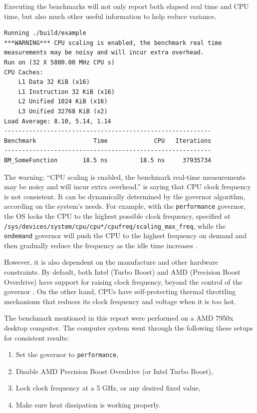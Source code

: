 \documentclass[logo,bsc,singlespacing,parskip]{infthesis}
\newenvironment{compactlist}
{ \begin{enumerate}
    \setlength{\itemsep}{0pt}
    \setlength{\parskip}{0pt}
    \setlength{\parsep}{0pt}     
}
{ \end{enumerate} }
\begin{document}
Executing the benchmarks will not only report both elapsed real time and CPU
time, but also much other useful information to help reduce variance. 
\begin{verbatim}
Running ./build/example
***WARNING*** CPU scaling is enabled, the benchmark real time 
measurements may be noisy and will incur extra overhead.
Run on (32 X 5800.00 MHz CPU s)
CPU Caches:
    L1 Data 32 KiB (x16)
    L1 Instruction 32 KiB (x16)
    L2 Unified 1024 KiB (x16)
    L3 Unified 32768 KiB (x2)
Load Average: 8.10, 5.14, 1.14
----------------------------------------------------------
Benchmark                Time             CPU   Iterations
----------------------------------------------------------
BM_SomeFunction       18.5 ns         18.5 ns     37935734
\end{verbatim}

The warning: ``CPU scaling is enabled, the benchmark real-time measurements may
be noisy and will incur extra overhead.'' is saying that CPU clock frequency is
not consistent. It can be dynamically determined by the governor algorithm,
according on the system's needs. For example, with the \texttt{performance}
governor, the OS locks the CPU to the highest possible clock frequency,
specified at \texttt{/sys/devices/system/cpu/cpu*/cpufreq/scaling\_max\_freq},
while the \texttt{ondemand} governor will push the CPU to the highest frequency
on demand and then gradually reduce the frequency as the idle time increases
\cite{archLinuxFreqScal}.

However, it is also dependent on the manufacture and other hardware constraints.
By default, both Intel (Turbo Boost) and AMD (Precision Boost Overdrive) have
support for raising clock frequency, beyond the control of the governor
\cite{GoogleBenchReduceVariance}. On the other hand, CPUs have self-protecting
thermal throttling mechanisms that reduces its clock frequency and voltage when
it is too hot. 

The benchmark mentioned in this report were performed on a AMD 7950x desktop
computer. The computer system went through the following these setups for
consistent results:
\begin{compactlist}
    \item Set the governor to \texttt{performance}, 
    \item Disable AMD Precision Boost Overdrive (or Intel Turbo Boost), 
    \item Lock clock frequency at a 5 GHz, or any desired fixed value,
    \item Make sure heat dissipation is working properly.
\end{compactlist}
\end{document}
